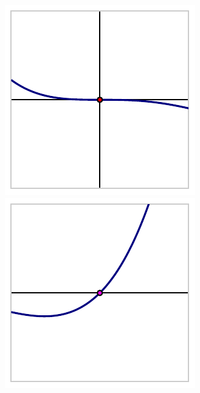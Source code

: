 \documentclass{ximera}
\begin{document}
\begin{image}
\includegraphics[width=1\linewidth]{images/polynomial-3-1-3}
\includegraphics[width=1\linewidth]{images/polynomial-3-1-1}
\end{image}
\end{document}
